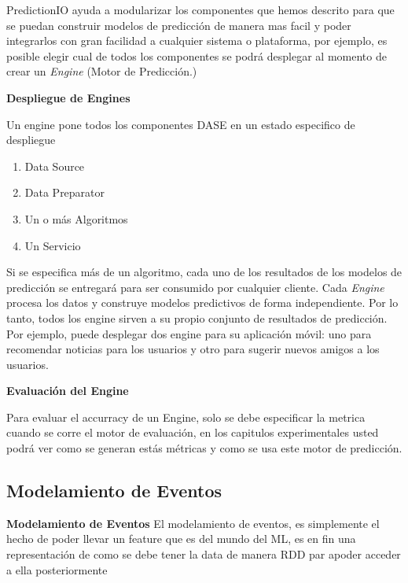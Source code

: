 PredictionIO ayuda a modularizar los componentes que hemos descrito  para que se puedan construir modelos de predicción de manera mas facil y poder integrarlos con gran facilidad a cualquier sistema o plataforma, por ejemplo, es posible elegir cual de todos los componentes se podrá desplegar al momento de crear un \emph{Engine} (Motor de Predicción.)




\textbf{Despliegue de Engines}

  Un engine pone todos los componentes DASE en un estado especifico de despliegue

  \begin{enumerate}
    \item Data Source
    \item Data Preparator
    \item Un o más Algoritmos
    \item Un Servicio

  \end{enumerate}

  Si se especifica más de un algoritmo, cada uno de los resultados de los modelos de predicción se entregará para ser consumido por cualquier cliente.
  Cada \emph{Engine} procesa los datos y construye modelos predictivos de forma independiente. Por lo tanto, todos los engine sirven a su propio conjunto de resultados de predicción. Por ejemplo, puede desplegar dos engine para su aplicación móvil: uno para recomendar noticias para los usuarios y otro para sugerir nuevos amigos a los usuarios.



\textbf{Evaluación del Engine }

  Para evaluar el accurracy de un Engine, solo se debe especificar la metrica cuando se corre el motor de evaluación, en los capitulos experimentales usted podrá ver como se generan estás métricas y como se usa este motor de predicción.











  \subsection{Modelamiento de Eventos}



\textbf{Modelamiento de Eventos}
  El modelamiento de eventos, es simplemente el hecho de poder llevar un feature  que es del mundo del ML, es en fin una representación de como se debe tener la data de manera RDD par apoder acceder a ella posteriormente 

